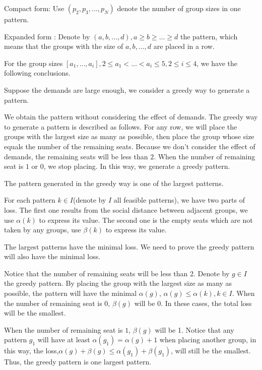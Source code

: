 Compact form: Use $(p_2,p_3,\ldots,p_N)$ denote the number of group sizes in one pattern.

Expanded form : Denote by $(a,b,\ldots,d), a \geq b \geq \ldots \geq d$ the pattern, which means that the groups with the size of $a,b, \ldots, d$ are placed in a row.


For the group sizes $[a_1,\ldots,a_i], 2 \leq a_1<\ldots<a_i \leq 5, 2 \leq i \leq 4$, we have the following conclusions.

Suppose the demands are large enough, we consider a greedy way to generate a pattern.

\begin{definition}
We obtain the pattern without considering the effect of demands. The greedy way to generate a pattern is described as follows.
For any row, we will place the groups with the largest size as many as possible, then place the group whose size equals the number of the remaining seats. Because we don't consider the effect of demands, the remaining seats will be less than $2$. When the number of remaining seat is $1$ or $0$, we stop placing. In this way, we generate a greedy pattern.
\end{definition}

\begin{lem}\label{largest}
The pattern generated in the greedy way is one of the largest patterns.
\end{lem}

\begin{pf}
For each pattern $k \in I$(denote by $I$ all feasible patterns), we have two parts of loss. The first one results from the social distance between adjacent groups, we use $\alpha(k)$ to express its value. The second one is the empty seats which are not taken by any groups, use $\beta(k)$ to express its value.

The largest patterns have the minimal loss. We need to prove the greedy pattern will also have the minimal loss.

Notice that the number of remaining seats will be less than 2. Denote by $g \in I$ the greedy pattern. By placing the group with the largest size as many as possible, the pattern will have the minimal $\alpha(g)$, $\alpha(g) \leq \alpha(k), k \in I$. When the number of remaining seat is $0$, $\beta(g)$ will be 0. In these cases, the total loss will be the smallest.

When the number of remaining seat is $1$, $\beta(g)$ will be 1. Notice that any pattern $g_1$ will have at least $\alpha(g_1) = \alpha(g)+1$ when placing another group, in this way, the loss,$\alpha(g) + \beta(g) \leq \alpha(g_1)+\beta(g_1)$, will still be the smallest.
Thus, the greedy pattern is one largest pattern.
\end{pf}

